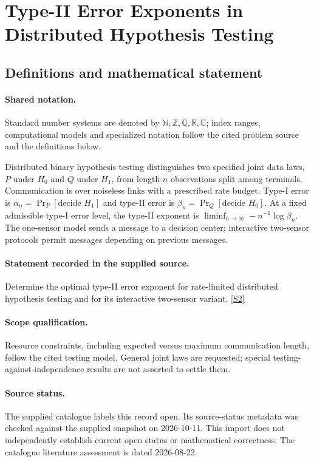 \documentclass[11pt]{article}
\newcommand{\sref}[2]{\hyperlink{source:#1:#2}{[S#2]}}
\begin{document}
\section{Type-II Error Exponents in Distributed Hypothesis Testing}\label{statement}

\subsection{Definitions and mathematical statement}

\paragraph{Shared notation.}Standard number systems are denoted by $\mathbb N,\mathbb Z,\mathbb Q,\mathbb R,\mathbb C$; index ranges, computational models and specialized notation follow the cited problem source and the definitions below.


Distributed binary hypothesis testing distinguishes two specified joint data laws, $P$ under $H_0$ and $Q$ under $H_1$, from length-$n$ observations split among terminals. Communication is over noiseless links with a prescribed rate budget. Type-I error is $\alpha_n=\Pr_P[\text{decide }H_1]$ and type-II error is $\beta_n=\Pr_Q[\text{decide }H_0]$. At a fixed admissible type-I error level, the type-II exponent is $\liminf_{n\to\infty}-n^{-1}\log\beta_n$. The one-sensor model sends a message to a decision center; interactive two-sensor protocols permit messages depending on previous messages.
\paragraph{Statement recorded in the supplied source.}
Determine the optimal type-II error exponent for rate-limited distributed hypothesis testing and for its interactive two-sensor variant. \sref{statement}{2}
\paragraph{Scope qualification.}
Resource constraints, including expected versus maximum communication length, follow the cited testing model. General joint laws are requested; special testing-against-independence results are not asserted to settle them.
\paragraph{Source status.}
The supplied catalogue labels this record open. Its source-status metadata was checked against the supplied snapshot on 2026-10-11. This import does not independently establish current open status or mathematical correctness. The catalogue literature assessment is dated 2026-08-22.
\end{document}
